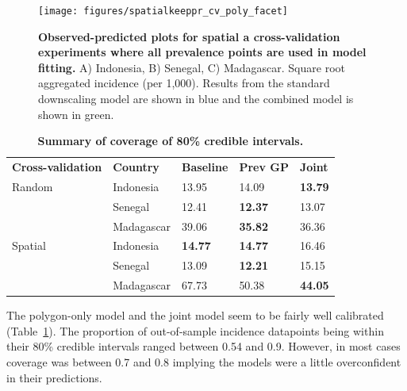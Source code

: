 \documentclass[10pt,letterpaper]{article}
\newlength\savedwidth
\newcommand\thickhline{\noalign{\global\savedwidth\arrayrulewidth\global\arrayrulewidth 2pt}%
\hline
\noalign{\global\arrayrulewidth\savedwidth}}
\begin{document}


\begin{figure}
\texttt{[image: figures/spatialkeeppr\_cv\_poly\_facet]}  
\caption{{\bf Observed-predicted plots for spatial a cross-validation experiments where all prevalence points are used in model fitting.}
A) Indonesia, B) Senegal, C) Madagascar. Square root aggregated incidence (per 1,000).
Results from the standard downscaling model are shown in blue and the combined model is shown in green.
}
\label{spatial2predobspolyfacet}
\end{figure}



\begin{table}[t]
\begin{adjustwidth}{-2.25in}{0in} %
\centering
\caption{
{\bf Summary of coverage of 80\% credible intervals.}}
\begin{tabular}{lllll}
\hline
{\bf Cross-validation} & {\bf Country}  & {\bf Baseline} & {\bf Prev GP} & {\bf Joint} \\
\thickhline 
Random & Indonesia  & 13.95 &  14.09 &  {\bf 13.79}\\
& Senegal  & 12.41 &  {\bf 12.37} &  13.07\\
& Madagascar  & 39.06 &  {\bf 35.82} &  36.36\vspace{3mm}\\
Spatial & Indonesia & {\bf 14.77} &  {\bf 14.77} &  16.46\\
& Senegal  & 13.09 &  {\bf 12.21} &  15.15\\
& Madagascar & 67.73 &  50.38 &  {\bf 44.05}\\


\end{tabular}
\begin{flushleft}

\end{flushleft}
\label{table3}
\end{adjustwidth}
\end{table}





The polygon-only model and the joint model seem to be fairly well calibrated (Table~\ref{table3}).
The proportion of out-of-sample incidence datapoints being within their 80\% credible intervals ranged between 0.54 and 0.9.
However, in most cases coverage was between 0.7 and 0.8 implying the models were a little overconfident in their predictions.
\end{document}
